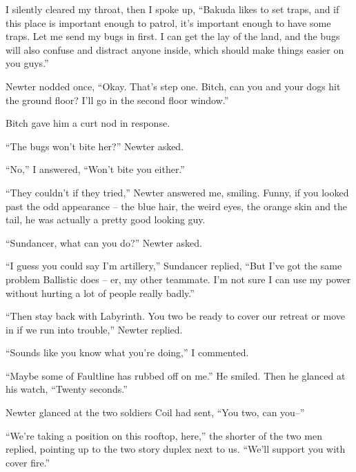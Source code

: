 I silently cleared my throat, then I spoke up, ``Bakuda likes to set traps, and if this place is important enough to patrol, it's important enough to have some traps.  Let me send my bugs in first.  I can get the lay of the land, and the bugs will also confuse and distract anyone inside, which should make things easier on you guys.''



Newter nodded once, ``Okay.  That's step one.  Bitch, can you and your dogs hit the ground floor?  I'll go in the second floor window.''



Bitch gave him a curt nod in response.



``The bugs won't bite her?'' Newter asked.



``No,'' I answered, ``Won't bite you either.''



``They couldn't if they tried,'' Newter answered me, smiling.  Funny, if you looked past the odd appearance – the blue hair, the weird eyes, the orange skin and the tail, he was actually a pretty good looking guy.



``Sundancer, what can you do?'' Newter asked.



``I guess you could say I'm artillery,'' Sundancer replied, ``But I've got the same problem Ballistic does – er, my other teammate.  I'm not sure I can use my power without hurting a lot of people really badly.''



``Then stay back with Labyrinth.  You two be ready to cover our retreat or move in if we run into trouble,'' Newter replied.



``Sounds like you know what you're doing,'' I commented.



``Maybe some of Faultline has rubbed off on me.''  He smiled.  Then he glanced at his watch, ``Twenty seconds.''



Newter glanced at the two soldiers Coil had sent, ``You two, can you--''



``We're taking a position on this rooftop, here,'' the shorter of the two men replied, pointing up to the two story duplex next to us.  ``We'll support you with cover fire.''



